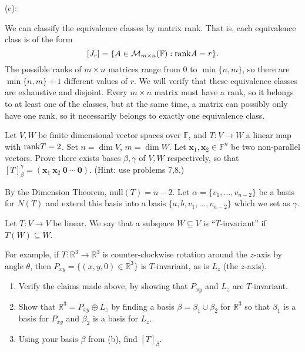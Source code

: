 \documentclass{eh-homework}
\begin{document}
\begin{question}{9}
        \medskip

        (c):

        We can classify the equivalence classes by matrix rank. That is, each equivalence class is of the form
        \[
            [J_r] = \{ A \in \mathcal{M} _{m\times n}(\mathbb{F}) : \mathrm{rank} A = r\}.
        \]
        The possible ranks of \(m\times n\) matrices range from \(0\) to \(\min \{ n,m \}\), so there are \(\min \{ n,m \} + 1\) different values of \(r\). We will verify that these equivalence classes are exhaustive and disjoint. Every \(m \times n\) matrix must have a rank, so it belongs to at least one of the classes, but at the same time, a matrix can possibly only have one rank, so it necessarily belongs to exactly one equivalence class.
    \end{question}

    \begin{question}{10}
        Let \( V, W \) be finite dimensional vector spaces over \( \mathbb{F} \), and \( T : V \to W \) a linear map with \(\mathrm{rank} T = 2\). Set \( n = \dim V \), \( m = \dim W \). Let \( \mathbf{x}_1, \mathbf{x}_2 \in \mathbb{F}^n \) be two non-parallel vectors. Prove there exists bases \( \beta, \gamma \) of \( V, W \) respectively, so that \( [T]_\beta^\gamma = (\mathbf{x}_1 \ \mathbf{x}_2 \ \mathbf{0} \ \cdots \ \mathbf{0}) \). (Hint: use problems 7,8.)

        \tcblower

        By the Dimension Theorem, \(\mathrm{null}(T) = n-2 \). Let \(\alpha = \{ v_1, ..., v_{n-2} \}\) be a basis for \(N(T)\) and extend this basis into a basis \(\{ a, b, v_1, ..., v_{n-2}\}\) which we set as \(\gamma\).
    \end{question}

    \begin{question}{11}
        Let \( T : V \to V \) be linear. We say that a subspace \( W \subseteq V \) is ``\( T \)-invariant'' if \( T(W) \subseteq W \).

        For example, if \( T : \mathbb{R}^3 \to \mathbb{R}^3 \) is counter-clockwise rotation around the \( z \)-axis by angle \( \theta \), then \( P_{xy} = \{(x, y, 0) \in \mathbb{R}^3\} \) is \( T \)-invariant, as is \( L_z \) (the \( z \)-axis).

        \begin{enumerate}[label=(\alph*)]
            \item Verify the claims made above, by showing that \( P_{xy} \) and \( L_z \) are \( T \)-invariant.
            \item Show that \( \mathbb{R}^3 = P_{xy} \oplus L_z \) by finding a basis \( \beta = \beta_1 \cup \beta_2 \) for \( \mathbb{R}^3 \) so that \( \beta_1 \) is a basis for \( P_{xy} \) and \( \beta_2 \) is a basis for \( L_z \).
            \item Using your basis \( \beta \) from (b), find \( [T]_\beta \).
        \end{enumerate}
    \end{question}
\end{document}
